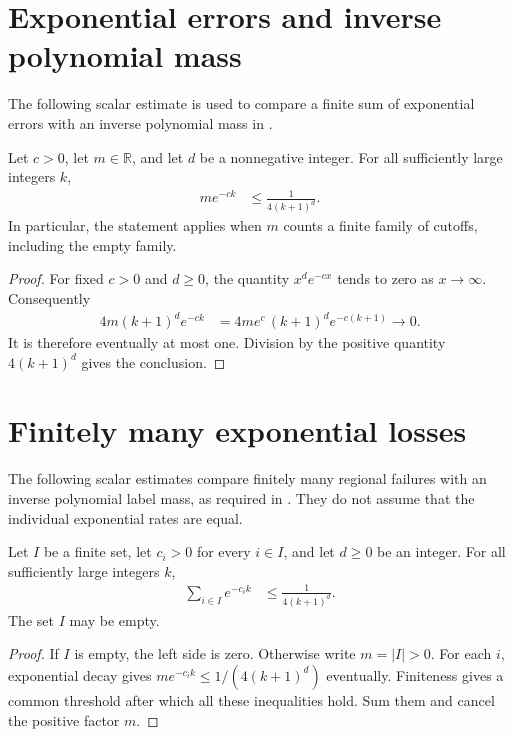 \section{Exponential errors and inverse polynomial mass}
\label{sec:exponential_polynomial_absorption}

The following scalar estimate is used to compare a finite sum of
exponential errors with an inverse polynomial mass in
\cite[Section~7]{OpenAI2026AreaLaw}.

\begin{theorem}
    \label{thm:exponential_polynomial_absorption}
    \leanok
    Let $c>0$, let $m\in\mathbb R$, and let $d$ be a nonnegative integer.
    For all sufficiently large integers $k$,
    \begin{align*}
        m e^{-ck} & \le\frac{1}{4(k+1)^d}.
    \end{align*}
    In particular, the statement applies when $m$ counts a finite family of
    cutoffs, including the empty family.
\end{theorem}
\begin{proof}\leanok
    For fixed $c>0$ and $d\ge0$, the quantity $x^d e^{-cx}$ tends to zero
    as $x\to\infty$. Consequently
    \begin{align*}
        4m(k+1)^d e^{-ck}
         & =4m e^c\,(k+1)^d e^{-c(k+1)}
        \longrightarrow 0.
    \end{align*}
    It is therefore eventually at most one. Division by the positive
    quantity $4(k+1)^d$ gives the conclusion.
\end{proof}

\section{Finitely many exponential losses}
\label{sec:finite_exponential_retained_mass}

The following scalar estimates compare finitely many regional failures
with an inverse polynomial label mass, as required in
\cite[Section~7]{OpenAI2026AreaLaw}. They do not assume that the
individual exponential rates are equal.

\begin{theorem}
\label{thm:finite_exponential_polynomial_absorption}
    \leanok
{}
Let $I$ be a finite set, let $c_i>0$ for every $i\in I$, and let
$d\ge0$ be an integer. For all sufficiently large integers $k$,
\begin{align}
 \sum_{i\in I}e^{-c_i k}&\le\frac{1}{4(k+1)^d}.
\end{align}
The set $I$ may be empty.
\end{theorem}
\begin{proof}
    \leanok
If $I$ is empty, the left side is zero. Otherwise write $m=|I|>0$.
For each $i$, exponential decay gives
$m e^{-c_i k}\le 1/(4(k+1)^d)$ eventually. Finiteness gives a common
threshold after which all these inequalities hold. Sum them and cancel
the positive factor $m$.
\end{proof}

